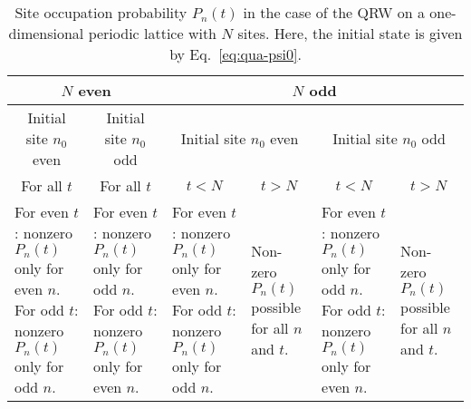 \documentclass[12pt]{iopart}
\begin{document}
\begin{table*}
\centering
\begin{tabular}{|p{2.7cm} | p{2.7cm} | p{2.7cm} | p{1.75cm} | p{2.7cm} | p{1.75cm}|}
\hline
\multicolumn{2}{|c|}{$N$ even} & \multicolumn{4}{c|}{$N$ odd}\\
\hline  \hline
\multicolumn{1}{|c|}{Initial site $n_0$ even} &
        \multicolumn{1}{c|}{Initial site $n_0$ odd} &
        \multicolumn{2}{c|}{Initial site $n_0$ even} &
        \multicolumn{2}{c|}{Initial site $n_0$ odd} \\
\hline
\multicolumn{1}{|c|}{For all $t$} & \multicolumn{1}{c|}{For all $t$} & \multicolumn{1}{c|}{$t<N$} & \multicolumn{1}{c|}{$t > N$} & \multicolumn{1}{c|}{$t<N$} & \multicolumn{1}{c|}{$t > N$} \\
\cline{1-6}
\shortstack[l]{\\ For even $t$: nonzero \\ $P_n(t)$ only for even $n$. \\ For odd $t$: nonzero \\ $P_n(t)$ only for odd $n$.} &
\shortstack[l]{\\ For even $t$: nonzero \\$P_n(t)$ only for odd $n$. \\ For odd $t$:  nonzero \\ $P_n(t)$ only for even $n$.} &
\shortstack[l]{\\ For even $t$: nonzero \\ $P_n(t)$ only for even $n$. \\ For odd $t$: nonzero \\ $P_n(t)$ only for odd $n$.} & 
\shortstack[l]{\\ Non-zero $P_n(t)$ \\ possible for all \\ $n$ and $t$.  {} \\ {} \\ {} } & 
\shortstack[l]{\\ For even $t$: nonzero \\ $P_n(t)$ only for odd $n$. \\ For odd $t$: nonzero \\ $P_n(t)$ only for even $n$.} & 
\shortstack[l]{\\ Non-zero $P_n(t)$ \\ possible for all \\ $n$ and $t$.  {} \\ {} \\ {} } \\
\hline
\end{tabular}
\caption{Site occupation probability $P_n(t)$ in the case of the QRW on a
one-dimensional periodic lattice with $N$ sites. Here, the initial state
is given  by Eq.~\eqref{eq:qua-psi0}.}
\label{table:qrw}
\end{table*}
\end{document}
